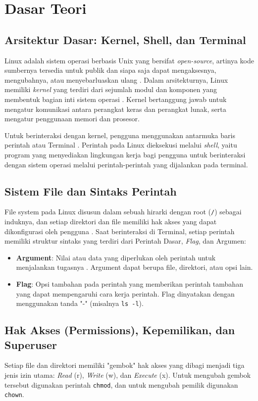 \newpage
\section{Dasar Teori}

\subsection{Arsitektur Dasar: Kernel, Shell, dan Terminal}
Linux adalah sistem operasi berbasis Unix yang bersifat \textit{open-source}, artinya kode sumbernya tersedia untuk publik dan siapa saja dapat mengaksesnya, mengubahnya, atau menyebarluaskan ulang \cite{das2012unix}. 
Dalam arsitekturnya, Linux memiliki \textit{kernel} yang terdiri dari sejumlah modul dan komponen yang membentuk bagian inti sistem operasi \cite{Silberschatz2018}. Kernel bertanggung jawab untuk mengatur komunikasi antara perangkat keras dan perangkat lunak, serta mengatur penggunaan memori dan prosesor. 

Untuk berinteraksi dengan kernel, pengguna menggunakan antarmuka baris perintah atau Terminal \cite{shotts2019linux}. Perintah pada Linux dieksekusi melalui \textit{shell}, yaitu program yang menyediakan lingkungan kerja bagi pengguna untuk berinteraksi dengan sistem operasi melalui perintah-perintah yang dijalankan pada terminal. 

\subsection{Sistem File dan Sintaks Perintah}
File system pada Linux disusun dalam sebuah hirarki dengan root (\texttt{/}) sebagai induknya, dan setiap direktori dan file memiliki hak akses yang dapat dikonfigurasi oleh pengguna \cite{das2012unix}. 
Saat berinteraksi di Terminal, setiap perintah memiliki struktur sintaks yang terdiri dari Perintah Dasar, \textit{Flag}, dan Argumen:
\begin{itemize}
	\item \textbf{Argument}: Nilai atau data yang diperlukan oleh perintah untuk menjalankan tugasnya \cite{shotts2019linux}. Argument dapat berupa file, direktori, atau opsi lain.
	\item \textbf{Flag}: Opsi tambahan pada perintah yang memberikan perintah tambahan yang dapat mempengaruhi cara kerja perintah. Flag dinyatakan dengan menggunakan tanda "-" (misalnya \texttt{ls -l}).
\end{itemize}

\subsection{Hak Akses (Permissions), Kepemilikan, dan Superuser}
Setiap file dan direktori memiliki "gembok" hak akses yang dibagi menjadi tiga jenis izin utama: \textit{Read} (r), \textit{Write} (w), dan \textit{Execute} (x). Untuk mengubah gembok tersebut digunakan perintah \texttt{chmod}, dan untuk mengubah pemilik digunakan \texttt{chown}.

